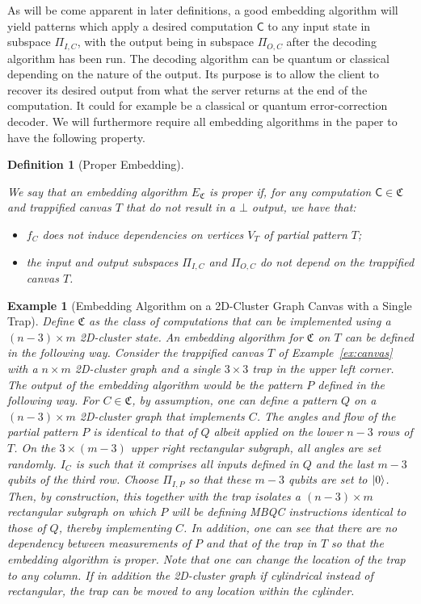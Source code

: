 \documentclass[12pt]{iopart}
\newcommand{\cptp}[1]{\mathsf{#1}} \newcommand{\pd}[1]{\mathcal{#1}}  \newcommand{\sch}[1]{\bm{#1}}
\renewcommand{\1}{\mathds{1}}
\newtheorem{definition}{Definition}
\newtheorem{example}{Example}
\begin{document}
As will be come apparent in later definitions, a good embedding algorithm will yield patterns which apply a desired computation $\cptp C$ to any input state in subspace $\Pi_{I,C}$, with the output being in subspace $\Pi_{O,C}$ after the decoding algorithm has been run. The decoding algorithm can be quantum or classical depending on the nature of the output. Its purpose is to allow the client to recover its desired output from what the server returns at the end of the computation. It could for example be a classical or quantum error-correction decoder. We will furthermore require all embedding algorithms in the paper to have the following property.

\begin{definition}[Proper Embedding]
\label{def:prop-embed}

We say that an embedding algorithm $E_{\mathfrak{C}}$ is \emph{proper} if, for any computation $\cptp{C} \in \mathfrak{C}$ and trappified canvas $T$ that do not result in a $\bot$ output, we have that:
\begin{itemize}
\item $f_C$ does not induce dependencies on vertices $V_T$ of partial pattern $T$;
\item the input and output subspaces $\Pi_{I,C}$ and $\Pi_{O,C}$ do not depend on the trappified canvas $T$.
\end{itemize}

\end{definition}

\begin{example}[Embedding Algorithm on a 2D-Cluster Graph Canvas with a Single Trap]
  \label{ex:embedding}
  Define $\mathfrak C$ as the class of computations that can be implemented using a $(n-3) \times m$ 2D-cluster state. An embedding algorithm for $\mathfrak C$ on $T$ can be defined in the following way.  Consider the trappified canvas $T$ of Example~\ref{ex:canvas} with a $n\times m$ 2D-cluster graph and a single $3\times 3$ trap in the upper left corner.  The output of the embedding algorithm would be the pattern $P$ defined in the following way.  For $C \in \mathfrak C$, by assumption, one can define a pattern $Q$ on a $(n-3) \times m$ 2D-cluster graph that implements $C$.  The angles and flow of the partial pattern $P$ is identical to that of $Q$ albeit applied on the lower $n-3$ rows of $T$. On the $3 \times (m-3)$ upper right rectangular subgraph, all angles are set randomly. $I_{C}$ is such that it comprises all inputs defined in $Q$ and the last $m-3$ qubits of the third row. Choose $\Pi_{I,P}$ so that these $m-3$ qubits are set to $\ket 0$.  Then, by construction, this together with the trap isolates a $(n-3)\times m$ rectangular subgraph on which $P$ will be defining MBQC instructions identical to those of $Q$, thereby implementing $C$. In addition, one can see that there are no dependency between measurements of $P$ and that of the trap in $T$ so that the embedding algorithm is proper. Note that one can change the location of the trap to any column. If in addition the 2D-cluster graph if cylindrical instead of rectangular, the trap can be moved to any location within the cylinder.
\end{example}
\end{document}
